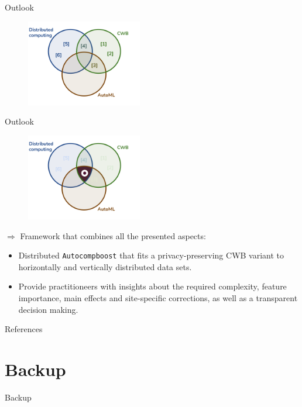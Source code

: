 \documentclass[t,10pt]{beamer}
\begin{document}
\begin{frame}{Outlook}
  \begin{figure}
    \centering
    \includegraphics[width=0.45\textwidth]{figures/topics.png}
  \end{figure}
\end{frame}

\begin{frame}{Outlook}
  \begin{figure}
    \centering
    \includegraphics[width=0.45\textwidth]{figures/topics-outlook.png}
  \end{figure}
  \item[$\Rightarrow$] Framework that combines all the presented aspects:
    \begin{itemize}
      \item Distributed \texttt{Autocompboost} that fits a privacy-preserving CWB variant to horizontally and vertically distributed data sets.\vspace{0.1cm}
      \item Provide practitioneers with insights about the required complexity, feature importance, main effects and site-specific corrections, as well as a transparent decision making.
    \end{itemize}
	\addtocounter{framenumber}{-1}
\end{frame}


\appendix

\begin{frame}[allowframebreaks]{References}
\nocite{*}
\scriptsize


\end{frame}

\section{Backup}

\begin{frame}{Backup}
\end{frame}
\end{document}
